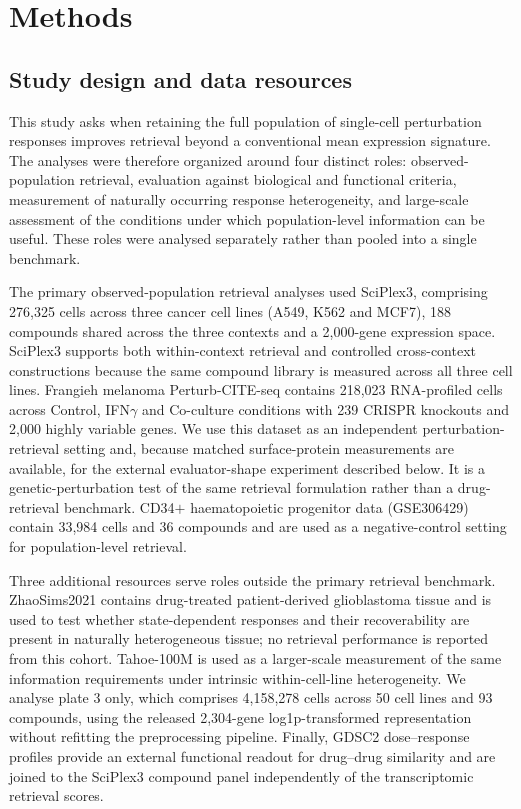 \documentclass[11pt,letterpaper]{article}
\begin{document}
\section*{Methods}

\subsection*{Study design and data resources}

This study asks when retaining the full population of single-cell perturbation responses improves retrieval beyond a conventional mean expression signature. The analyses were therefore organized around four distinct roles: observed-population retrieval, evaluation against biological and functional criteria, measurement of naturally occurring response heterogeneity, and large-scale assessment of the conditions under which population-level information can be useful. These roles were analysed separately rather than pooled into a single benchmark.

The primary observed-population retrieval analyses used SciPlex3\cite{dataSciPlex3}, comprising 276,325 cells across three cancer cell lines (A549, K562 and MCF7), 188 compounds shared across the three contexts and a 2,000-gene expression space. SciPlex3 supports both within-context retrieval and controlled cross-context constructions because the same compound library is measured across all three cell lines. Frangieh melanoma Perturb-CITE-seq\cite{dataFrangieh} contains 218,023 RNA-profiled cells across Control, IFN$\gamma$ and Co-culture conditions with 239 CRISPR knockouts and 2,000 highly variable genes. We use this dataset as an independent perturbation-retrieval setting and, because matched surface-protein measurements are available, for the external evaluator-shape experiment described below. It is a genetic-perturbation test of the same retrieval formulation rather than a drug-retrieval benchmark. CD34$+$ haematopoietic progenitor data (GSE306429)\cite{dataCD34} contain 33,984 cells and 36 compounds and are used as a negative-control setting for population-level retrieval.

Three additional resources serve roles outside the primary retrieval benchmark. ZhaoSims2021\cite{dataZhao} contains drug-treated patient-derived glioblastoma tissue and is used to test whether state-dependent responses and their recoverability are present in naturally heterogeneous tissue; no retrieval performance is reported from this cohort. Tahoe-100M\cite{Tahoe100M} is used as a larger-scale measurement of the same information requirements under intrinsic within-cell-line heterogeneity. We analyse plate 3 only, which comprises 4,158,278 cells across 50 cell lines and 93 compounds, using the released 2,304-gene log1p-transformed representation without refitting the preprocessing pipeline. Finally, GDSC2 dose--response profiles provide an external functional readout for drug--drug similarity and are joined to the SciPlex3 compound panel independently of the transcriptomic retrieval scores.
\end{document}
